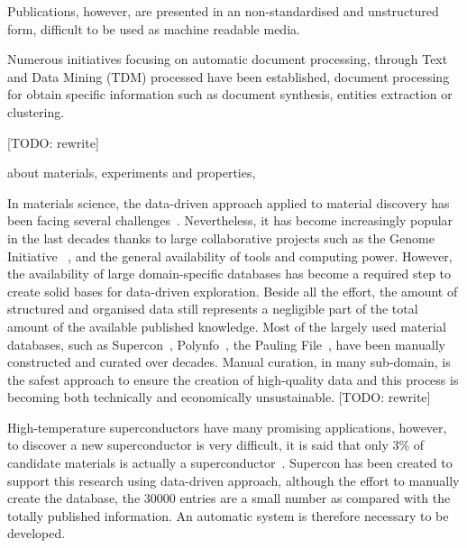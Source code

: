 \documentclass[a4paper,10pt]{article}
\begin{document}
Publications, however, are presented in an non-standardised and unstructured form, difficult to be used as machine readable media. 

Numerous initiatives focusing on automatic document processing, through Text and Data Mining (TDM) processed  have been established,  document processing for obtain specific  information such as document synthesis, entities extraction or clustering. 

[TODO: rewrite]


about materials, experiments and properties, 

In materials science, the  data-driven approach applied to material discovery has been facing several challenges~\cite{Hill2016MaterialsSW}. 
Nevertheless, it has become increasingly popular in the last decades thanks to large collaborative projects such as the Genome Initiative~\cite{material_genome_initiative} \cite{Jain2013CommentaryTM_materialsProject}, and the general availability of tools and computing power. 
However, the availability of large domain-specific databases has become a required step to create solid bases for data-driven exploration. 
Beside all the effort, the amount of structured and organised data still represents a negligible part of the total amount of the available published knowledge.
Most of the largely used material databases, such as Supercon~\cite{SuperCon}, Polynfo~\cite{polynfo}, the Pauling File~\cite{Blokhin2018ThePF_paulingFile}, have been manually constructed and curated over decades. Manual curation, in many sub-domain, is the safest approach to ensure the creation of high-quality data and this process is becoming both technically and economically unsustainable. 
[TODO: rewrite]


High-temperature superconductors have many promising applications, however, to discover a new superconductor is very difficult, it is said that only 3\% of candidate materials is actually a superconductor~\cite{Konno2018DeepLO}.
Supercon has been created to support this research using data-driven approach, although the effort to manually create the database, the 30000 entries are a small number as compared with the totally published information. 
An automatic system is therefore necessary to be developed. 
\end{document}
